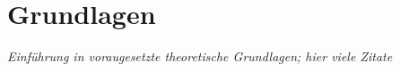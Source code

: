 \section{Grundlagen}

\textit{Einführung in voraugesetzte theoretische Grundlagen; hier viele Zitate}